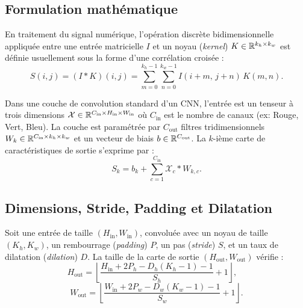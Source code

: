 \subsection{Formulation mathématique}

En traitement du signal numérique, l'opération discrète bidimensionnelle appliquée entre une entrée matricielle $I$ et un noyau (\emph{kernel}) $K \in \mathbb{R}^{k_h \times k_w}$ est définie usuellement sous la forme d'une corrélation croisée :
\begin{equation}
    S(i, j) = (I * K)(i, j) = \sum_{m=0}^{k_h-1} \sum_{n=0}^{k_w-1} I(i + m, \, j + n) \, K(m, n).
\end{equation}

Dans une couche de convolution standard d'un CNN, l'entrée est un tenseur à trois dimensions $\mathcal{X} \in \mathbb{R}^{C_{\mathrm{in}} \times H_{\mathrm{in}} \times W_{\mathrm{in}}}$ où $C_{\mathrm{in}}$ est le nombre de canaux (ex: Rouge, Vert, Bleu). La couche est paramétrée par $C_{\mathrm{out}}$ filtres tridimensionnels $W_k \in \mathbb{R}^{C_{\mathrm{in}} \times k_h \times k_w}$ et un vecteur de biais $b \in \mathbb{R}^{C_{\mathrm{out}}}$. La $k$-ième carte de caractéristiques de sortie s'exprime par :
\begin{equation}
    S_k = b_k + \sum_{c=1}^{C_{\mathrm{in}}} \mathcal{X}_c * W_{k, c}.
\end{equation}


\subsection{Dimensions, Stride, Padding et Dilatation}

\begin{prop}
    Soit une entrée de taille $(H_{\mathrm{in}}, W_{\mathrm{in}})$, convoluée avec un noyau de taille $(K_h, K_w)$, un rembourrage (\emph{padding}) $P$, un pas (\emph{stride}) $S$, et un taux de dilatation (\emph{dilation}) $D$. La taille de la carte de sortie $(H_{\mathrm{out}}, W_{\mathrm{out}})$ vérifie :
    \begin{equation}
        H_{\mathrm{out}} = \left\lfloor \frac{H_{\mathrm{in}} + 2P_h - D_h(K_h - 1) - 1}{S_h} + 1 \right\rfloor, \quad 
    \end{equation}
    \begin{equation}
        W_{\mathrm{out}} = \left\lfloor \frac{W_{\mathrm{in}} + 2P_w - D_w(K_w - 1) - 1}{S_w} + 1 \right\rfloor.
    \end{equation}
\end{prop}

